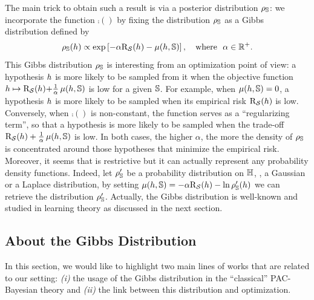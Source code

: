 The main trick to obtain such a result is via a posterior distribution $\AQ$: we incorporate the function $\comp()$ by fixing the distribution $\AQ$ as a Gibbs distribution defined by
\begin{align}
\label{chap:dis-mu:eq:gibbs-distribution}
   \AQ(\h) \propto \exp\LB-\alpha\Risk_{\dS}(\h)-\comp(\h, \S)\RB, \quad  
    \text{where}\ \  \alpha\in\mathbb{R}^+.
\end{align}
This Gibbs distribution $\AQ$ is interesting from an optimization point of view: a hypothesis $\h$ is more likely to be sampled from it when the objective function $\h \mapsto \Risk_{\dS}(\h){+}\frac{1}{\alpha}\comp(\h, \S)$ is low for a given $\S$.
For example, when $\comp(\h,\S)=0$, a hypothesis $\h$ is more likely to be sampled when its empirical risk $\Risk_{\dS}(\h)$ is low.
Conversely, when $\comp()$ is non-constant, the function serves as a ``regularizing term'', so that a hypothesis is more likely to be sampled when the trade-off $\Risk_{\dS}(\h)+\frac{1}{\alpha}\comp(\h, \S)$ is low. 
In both cases, the higher $\alpha$, the more the density of $\AQ$ is concentrated around those hypotheses that minimize the empirical risk.
Moreover, it seems that  is restrictive but it can actually represent any probability density functions.
Indeed, let $\AQ'$ be a probability distribution on $\H$, \eg, a Gaussian or a Laplace distribution, by setting $\comp(\h, \S) = -\alpha\Risk_{\dS}(\h) - \ln\AQ'(\h)$ we can retrieve the distribution $\AQ'$.
Actually, the Gibbs distribution is well-known and studied in learning theory as discussed in the next section. 

\subsection{About the Gibbs Distribution}
\label{chap:dis-mu:sec:related-works}

In this section, we would like to highlight two main lines of works that are related to our setting: {\it (i)} the usage of the Gibbs distribution in the ``classical'' PAC-Bayesian theory and {\it (ii)} the link between this distribution and optimization.\\

